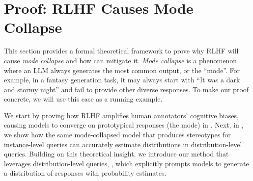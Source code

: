 \section{Proof: RLHF Causes Mode Collapse} \label{sec:proof}


This section provides a formal theoretical framework to prove  why RLHF will cause \emph{mode collapse} and how \ourslower can mitigate it. \emph{Mode collapse} is a phenomenon where an LLM always generates the most common output, or the ``mode''. For example, in a fantasy generation task, it may always start with ``It was a dark and stormy night'' 
and fail to provide other diverse responses. To make our proof concrete, we will use this case as a running example. 

We start by proving how RLHF amplifies human annotators' cognitive biases, causing models to converge on prototypical responses (the mode) in . Next, in , we show how the same mode-collapsed model that produces stereotypes for instance-level queries can accurately estimate distributions in distribution-level queries. %
Building on this theoretical insight, we introduce our method that leverages distribution-level queries, \emph{\ours}, which explicitly prompts models to generate a distribution of responses with probability estimates.

